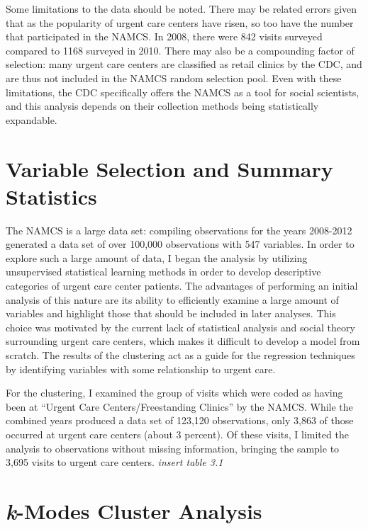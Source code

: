 \documentclass[12pt,twoside]{reedthesis}
\begin{document}
  Some limitations to the data should be noted. There may be related
  errors given that as the popularity of urgent care centers have risen,
  so too have the number that participated in the NAMCS. In 2008, there
  were 842 visits surveyed compared to 1168 surveyed in 2010. There may
  also be a compounding factor of selection: many urgent care centers are
  classified as retail clinics by the CDC, and are thus not included in
  the NAMCS random selection pool. Even with these limitations, the CDC
  specifically offers the NAMCS as a tool for social scientists, and this
  analysis depends on their collection methods being statistically
  expandable.
  
  \section*{Variable Selection and Summary
  Statistics}\label{variable-selection-and-summary-statistics}
  
  The NAMCS is a large data set: compiling observations for the years
  2008-2012 generated a data set of over 100,000 observations with 547
  variables. In order to explore such a large amount of data, I began the
  analysis by utilizing unsupervised statistical learning methods in order
  to develop descriptive categories of urgent care center patients. The
  advantages of performing an initial analysis of this nature are its
  ability to efficiently examine a large amount of variables and highlight
  those that should be included in later analyses. This choice was
  motivated by the current lack of statistical analysis and social theory
  surrounding urgent care centers, which makes it difficult to develop a
  model from scratch. The results of the clustering act as a guide for the
  regression techniques by identifying variables with some relationship to
  urgent care.
  
  For the clustering, I examined the group of visits which were coded as
  having been at ``Urgent Care Centers/Freestanding Clinics'' by the
  NAMCS. While the combined years produced a data set of 123,120
  observations, only 3,863 of those occurred at urgent care centers (about
  3 percent). Of these visits, I limited the analysis to observations
  without missing information, bringing the sample to 3,695 visits to
  urgent care centers. \emph{insert table 3.1}
  
  \section*{\texorpdfstring{\emph{k}-Modes Cluster
  Analysis}{k-Modes Cluster Analysis}}\label{k-modes-cluster-analysis}
  
\end{document}

